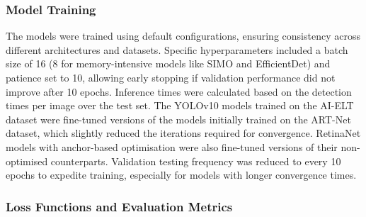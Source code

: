 

\subsubsection{Model Training}

The models were trained using default configurations, ensuring consistency across different architectures and datasets. Specific hyperparameters included a batch size of 16 (8 for memory-intensive models like SIMO and EfficientDet) and patience set to 10, allowing early stopping if validation performance did not improve after 10 epochs. Inference times were calculated based on the detection times per image over the test set. The YOLOv10 models trained on the AI-ELT dataset were fine-tuned versions of the models initially trained on the ART-Net dataset, which slightly reduced the iterations required for convergence. RetinaNet models with anchor-based optimisation were also fine-tuned versions of their non-optimised counterparts. Validation testing frequency was reduced to every 10 epochs to expedite training, especially for models with longer convergence times.


\subsubsection{Loss Functions and Evaluation Metrics}


